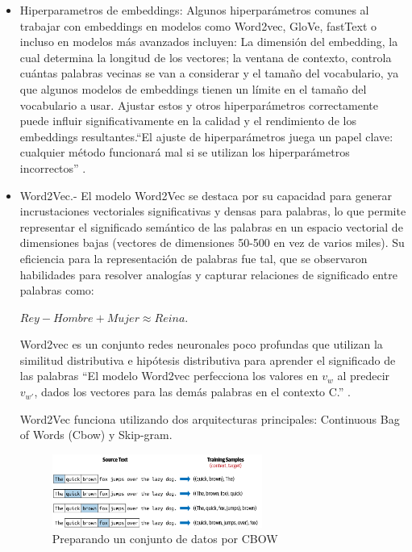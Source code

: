 \begin{itemize}
\begin{itemize}
	\item Hiperparametros de embeddings: Algunos hiperparámetros comunes al trabajar con embeddings en modelos como Word2vec, GloVe, fastText o incluso en modelos más avanzados incluyen:  La dimensión del embedding, la cual  determina la longitud de los vectores; la ventana de contexto, controla cuántas palabras vecinas se van a considerar y el tamaño del vocabulario, ya que algunos modelos de embeddings tienen un límite en el tamaño del vocabulario a usar. Ajustar estos y otros  hiperparámetros correctamente puede influir significativamente en la calidad y el rendimiento de los embeddings resultantes.``El ajuste de hiperparámetros juega un papel clave: cualquier método funcionará mal si se utilizan los hiperparámetros incorrectos'' \cite[p. 339]{eisenstein2018natural}.
	
	\item Word2Vec.- El modelo Word2Vec se destaca por su capacidad para generar incrustaciones vectoriales significativas y densas para palabras, lo que permite representar el significado semántico de las palabras en un espacio vectorial de dimensiones bajas (vectores de dimensiones 50-500 en vez de varios miles). Su eficiencia para la representación de palabras fue tal, que se observaron habilidades para resolver analogías y capturar relaciones de significado entre palabras como:  
	\begin{Center}
			$Rey - Hombre + Mujer \approx  Reina$.
	\end{Center}

	
Word2vec es un conjunto redes neuronales poco profundas que utilizan la similitud distributiva e hipótesis distributiva para aprender  el significado de las palabras ``El modelo Word2vec perfecciona los valores en $v_w$ al predecir $v_{w'}$, dados los vectores para las demás palabras en el contexto C.'' \cite[p. 95]{vajjala2020practical} .

Word2Vec funciona utilizando dos arquitecturas principales: Continuous Bag of Words (Cbow) y Skip-gram.

\begin{figure}
	\includegraphics[width=0.65\textwidth]{capitulo3/figuras/nlp3.png}
	\caption{Preparando un conjunto de datos por CBOW}
	\label{fig:nlp3}
\end{figure}


\end{itemize}
\end{itemize}
